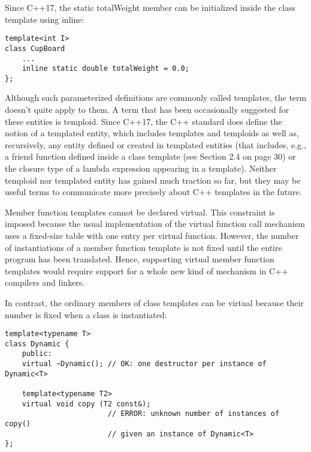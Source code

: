 Since C++17, the static totalWeight member can be initialized inside the class template using inline:

\begin{lstlisting}[style=styleCXX]
template<int I>
class CupBoard
	...
	inline static double totalWeight = 0.0;
};
\end{lstlisting}

Although such parameterized definitions are commonly called templates, the term doesn’t quite apply to them. A term that has been occasionally suggested for these entities is temploid. Since C++17, the C++ standard does define the notion of a templated entity, which includes templates and temploids as well as, recursively, any entity defined or created in templated entities (that includes, e.g., a friend function defined inside a class template (see Section 2.4 on page 30) or the closure type of a lambda expression appearing in a template). Neither temploid nor templated entity has gained much traction so far, but they may be useful terms to communicate more precisely about C++ templates in the future.


Member function templates cannot be declared virtual. This constraint is imposed because the usual implementation of the virtual function call mechanism uses a fixed-size table with one entry per virtual function. However, the number of instantiations of a member function template is not fixed until the entire program has been translated. Hence, supporting virtual member function templates would require support for a whole new kind of mechanism in C++ compilers and linkers.

In contrast, the ordinary members of class templates can be virtual because their number is fixed when a class is instantiated:

\begin{lstlisting}[style=styleCXX]
template<typename T>
class Dynamic {
	public:
	virtual ~Dynamic(); // OK: one destructor per instance of Dynamic<T>
	
	template<typename T2>
	virtual void copy (T2 const&);
						// ERROR: unknown number of instances of copy()
						// given an instance of Dynamic<T>
};
\end{lstlisting}


